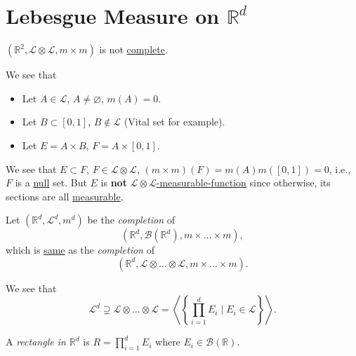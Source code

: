 \section{Lebesgue Measure on \(\mathbb{R} ^d\)}
\begin{eg}
	\((\mathbb{R} ^{2} , \mathcal{L} \otimes \mathcal{L}, m\times m)\) is not
	\hyperref[def:complete-measure-space]{complete}.
\end{eg}
\begin{explanation}
	We see that
	\begin{itemize}
		\item Let \(A\in \mathcal{L} \), \(A\neq \varnothing \), \(m(A) = 0\).
		\item Let \(B\subset [0, 1]\), \(B \notin \mathcal{L} \) (Vital set for example).
		\item Let \(E = A\times B\), \(F = A \times [0, 1]\).
	\end{itemize}
	We see that \(E\subset F\), \(F \in \mathcal{L} \otimes \mathcal{L} \), \((m\times m)(F)=m(A)m([0, 1]) = 0\), i.e.,
	\(F\) is a \hyperref[def:mu-null-set]{null} set. But \(E\) is \textbf{not}
	\hyperref[def:A-measurable-function]{\(\mathcal{L} \otimes \mathcal{L} \)-measurable-function} since otherwise,
	its sections are all \hyperref[def:A-measurable-function]{measurable}.
\end{explanation}
\begin{definition}
	Let \((\mathbb{R} ^d, \mathcal{L} ^d, m^d)\) be the \emph{completion} of
	\[
		(\mathbb{R} ^d, \mathcal{B} (\mathbb{R} ^d), m\times \dots \times m ),
	\]
	which is \underline{same} as the \emph{completion} of
	\[
		(\mathbb{R} ^d, \mathcal{L} \otimes \dots \otimes \mathcal{L}, m\times \dots \times m).
	\]
\end{definition}

\begin{remark}
	We see that
	\[
		\mathcal{L} ^d \supsetneq \mathcal{L} \otimes \dots \otimes \mathcal{L}
		= \left< \left\{ \prod\limits_{i=1}^{d}E_{i} \mid E_{i} \in \mathcal{L}  \right\} \right>.
	\]
\end{remark}

\begin{definition}\label{def:rectangle-in-Rd}
	A \emph{rectangle in \(\mathbb{R} ^d\)} is \(R = \prod\limits_{i=1}^{d} E_{i} \) where \(E_{i}\in \mathcal{B} (\mathbb{R} )\).
\end{definition}

